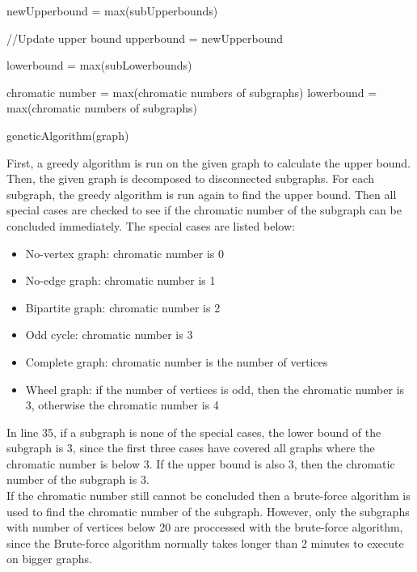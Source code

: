 \documentclass[a4paper]{report}
\begin{document}
		\begin{algorithm}                     
			\begin{algorithmic} [1]     

			\STATE newUpperbound = max(subUpperbounds)
			
			\STATE //Update upper bound
			\STATE upperbound = newUpperbound 
			\ENDIF
			
			\STATE lowerbound = max(subLowerbounds)
			
			\STATE chromatic number = max(chromatic numbers of subgraphs)
			\ELSE
			\STATE lowerbound = max(chromatic numbers of subgraphs)
			\ENDIF
			
			\STATE geneticAlgorithm(graph)
		\end{algorithmic}
	\end{algorithm}
	First, a greedy algorithm is run on the given graph to calculate the upper bound. Then, the given graph is decomposed to disconnected subgraphs. For each subgraph, the greedy algorithm is run again to find the upper bound. Then all special cases are checked to see if the chromatic number of the subgraph can be concluded immediately. The special cases are listed below: 
	\begin{itemize}
		\item No-vertex graph: chromatic number is 0
		\item No-edge graph: chromatic number is 1
		\item Bipartite graph: chromatic number is 2
		\item Odd cycle: chromatic number is 3
		\item Complete graph: chromatic number is the number of vertices
		\item Wheel graph: if the number of vertices is odd, then the chromatic number is 3, otherwise the chromatic number is 4
	\end{itemize}
	In line 35, if a subgraph is none of the special cases, the lower bound of the subgraph is 3, since the first three cases have covered all graphs where the chromatic number is below 3. If the upper bound is also 3, then the chromatic number of the subgraph is 3. \\
	If the chromatic number still cannot be concluded then a brute-force algorithm is used to find the chromatic number of the subgraph. However, only the subgraphs with number of vertices below 20 are proccessed with the brute-force algorithm, since the Brute-force algorithm normally takes longer than 2 minutes to execute on bigger graphs. \\
\end{document}
